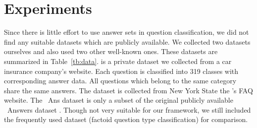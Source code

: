 \section{Experiments}
\label{sec:exp1}





Since there is little effort to use answer sets in question classification, we did not find any suitable datasets which are publicly available. 
We collected two datasets ourselves and also used two other well-known ones. %
These datasets are summarized in Table~\ref{tb:data}. 
\Insurance is a private dataset we collected from a car insurance company's website.
Each question is classified into  319 classes with corresponding answer data.
All questions which belong to the same category share the same answers. 
The \DMV dataset is collected from New York State the \DMV's FAQ website. %
The \Yahoo~Ans dataset is only a subset of the original publicly available \Yahoo~Answers dataset \cite{Fleming,Shah:2010:EPA:1835449.1835518}. %
Though not very suitable for our framework, 
we still included the frequently used \TREC dataset (factoid question type classification) for comparison.




